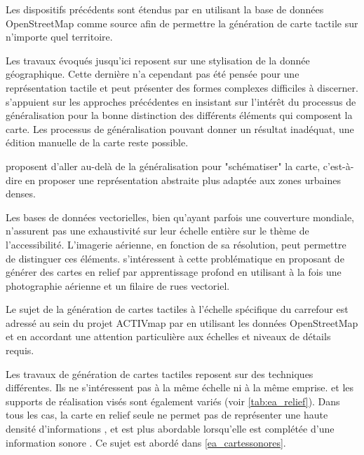 Les dispositifs précédents sont étendus par \cite{Watanabe2014, Cervenka2016} en utilisant la base de données OpenStreetMap comme source afin de permettre la génération de carte tactile sur n'importe quel territoire.

\newpar{}

Les travaux évoqués jusqu'ici reposent sur une stylisation de la donnée géographique. Cette dernière n'a cependant pas été pensée pour une représentation tactile et peut présenter des formes complexes difficiles à discerner. \cite{Stampach2016} s'appuient sur les approches précédentes en insistant sur l’intérêt du processus de généralisation pour la bonne distinction des différents éléments qui composent la carte. Les processus de généralisation pouvant donner un résultat inadéquat, une édition manuelle de la carte reste possible.

\cite{Touya2019} proposent d'aller au-delà de la généralisation pour "schématiser" la carte, c'est-à-dire en proposer une représentation abstraite plus adaptée aux zones urbaines denses. 

\newpar{}

Les bases de données vectorielles, bien qu'ayant parfois une couverture mondiale, n'assurent pas une exhaustivité sur leur échelle entière sur le thème de l'accessibilité. L'imagerie aérienne, en fonction de sa résolution, peut permettre de distinguer ces éléments. \cite{FillieresRiveau2020} s'intéressent à cette problématique en proposant de générer des cartes en relief par apprentissage profond en utilisant à la fois une photographie aérienne et un filaire de rues vectoriel. 

\newpar{}

Le sujet de la génération de cartes tactiles à l'échelle spécifique du carrefour est adressé au sein du projet ACTIVmap par \cite{Jiang2023} en utilisant les données OpenStreetMap et en accordant une attention particulière aux échelles et niveaux de détails requis.

Les travaux de génération de cartes tactiles reposent sur des techniques différentes. Ils ne s'intéressent pas à la même échelle ni à la même emprise. et les supports de réalisation visés sont également variés (voir \ref{tab:ea_relief}). Dans tous les cas, la carte en relief seule ne permet pas de représenter une haute densité d'informations \cite{Touya2019}, et est plus abordable lorsqu'elle est complétée d'une information sonore \cite{Brock2015}. Ce sujet est abordé dans \ref{ea_cartessonores}.

